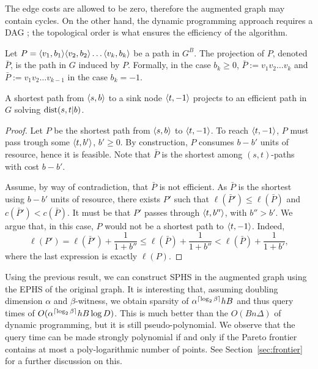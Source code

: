 \begin{remark}
The edge costs are allowed to be zero, therefore the augmented graph may contain cycles.
On the other hand, the dynamic programming approach requires a DAG ; the topological order is what ensures the efficiency of the algorithm.
\end{remark}

\begin{definition}
Let $P=\langle v_1,b_1\rangle\langle v_2,b_2\rangle\ldots\langle v_k,b_k\rangle$ be a path in $G^B$.
The projection of $P$, denoted $\bar P$, is the path in $G$ induced by $P$. 
Formally, in the case $b_k\geq 0$, $\bar P:=v_1v_2\ldots v_k$ and $\bar P:=v_1v_2\ldots v_{k-1}$ in the case $b_k=-1$. 
\end{definition}


\begin{proposition}\label{prop:shorteffic}
A shortest path from $\langle s,b\rangle$ to a sink node $\langle t,-1\rangle$ projects to an efficient path in $G$ solving $\text{dist}(s,t|b)$. 
\end{proposition}
\begin{proof}
Let $P$ be the shortest path from $\langle s,b\rangle$ to $\langle t,-1\rangle$.
To reach $\langle t,-1\rangle$, $P$ must pass trough some $\langle t,b'\rangle$, $b'\geq 0$.
By construction, $P$ consumes $b-b'$ units of resource, hence it is feasible.
Note that $\bar P$ is the shortest among $(s,t)$-paths with cost $b-b'$.

Assume, by way of contradiction, that $\bar P$ is not efficient.
As $\bar P$ is the shortest using $b-b'$ units of resource, there exists $P'$ such that $\ell(\bar P')\leq \ell(\bar P)$ and $c(\bar P')< c(\bar P)$.
It must be that $P'$ passes through $\langle t,b''\rangle$, with $b''>b'$.
We argue that, in this case, $P$ would not be a shortest path to $\langle t,-1\rangle$.
Indeed, 
\[
\ell(P')=\ell(\bar P')+\frac{1}{1+b''}
\leq \ell(\bar P) +\frac{1}{1+b''}
< \ell(\bar P) +\frac{1}{1+b'},
\]
where the last expression is exactly $\ell(P)$.
\end{proof}

Using the previous result, we can construct SPHS in the augmented graph using the EPHS of the original graph.
It is interesting that, assuming doubling dimension $\alpha$ and $\beta$-witness, we obtain sparsity of $\alpha^{\lceil\log_2\beta\rceil} hB$ and thus query times of $O(\alpha^{\lceil\log_2\beta\rceil} hB\log D)$.
This is much better than the $O(Bn\Delta)$ of dynamic programming, but it is still pseudo-polynomial.
We observe that the query time can be made strongly polynomial if and only if the Pareto frontier contains at most a poly-logarithmic number of points.
See Section~\ref{sec:frontier} for a further discussion on this.
 
